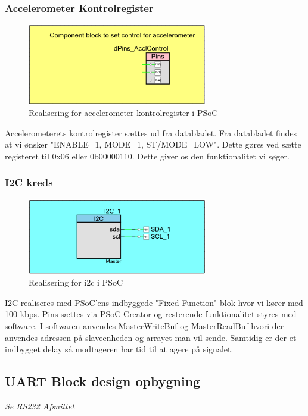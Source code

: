\subsubsection{Accelerometer Kontrolregister}
\begin{figure}[H]
\centering
\includegraphics[width=0.7\textwidth]{billeder/Kontrolpsoc}
\caption{Realisering for accelerometer kontrolregister i PSoC}
\label{fig:SMAccReg}
\end{figure}
Accelerometerets kontrolregister sættes ud fra databladet. Fra databladet findes at vi ønsker "ENABLE=1, MODE=1, ST/MODE=LOW". Dette gøres ved sætte registeret til 0x06 eller 0b00000110. Dette giver os den funktionalitet vi søger.
\subsubsection{I2C kreds}
\begin{figure}[H]
\centering
\includegraphics[width=0.7\textwidth]{billeder/i2cpsoc}
\caption{Realisering for i2c i PSoC}
\label{fig:SMi2c}
\end{figure}
I2C realiseres med PSoC'ens indbyggede "Fixed Function" blok hvor vi kører med 100 kbps. Pins sættes via PSoC Creator og resterende funktionalitet styres med software. I softwaren anvendes MasterWriteBuf og MasterReadBuf hvori der anvendes adressen på slaveenheden og arrayet man vil sende. Samtidig er der et indbygget delay så modtageren har tid til at agere på signalet. 
\subsection{UART Block design opbygning}
\textit{Se RS232 Afsnittet}